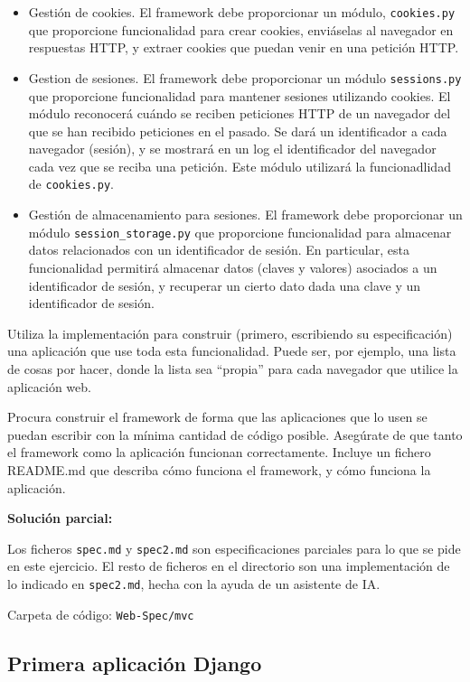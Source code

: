 \begin{itemize}
\item Gestión de cookies. El framework debe proporcionar un módulo, \texttt{cookies.py} que proporcione funcionalidad para crear cookies, enviáselas al navegador en respuestas HTTP, y extraer cookies que puedan venir en una petición HTTP.
\item Gestion de sesiones. El framework debe proporcionar un módulo \texttt{sessions.py} que proporcione funcionalidad para mantener sesiones utilizando cookies. El módulo reconocerá cuándo se reciben peticiones HTTP de un navegador del que se han recibido peticiones en el pasado. Se dará un identificador a cada navegador (sesión), y se mostrará en un log el identificador del navegador cada vez que se reciba una petición. Este módulo utilizará la funcionadlidad de \texttt{cookies.py}.
\item Gestión de almacenamiento para sesiones. El framework debe proporcionar un módulo \texttt{session\_storage.py} que proporcione funcionalidad para almacenar datos relacionados con un identificador de sesión. En particular, esta funcionalidad permitirá almacenar datos (claves y valores) asociados a un identificador de sesión, y recuperar un cierto dato dada una clave y un identificador de sesión.
\end{itemize}


Utiliza la implementación para construir (primero, escribiendo su especificación) una aplicación que use toda esta funcionalidad. Puede ser, por ejemplo, una lista de cosas por hacer, donde la lista sea ``propia'' para cada navegador que utilice la aplicación web.

Procura construir el framework de forma que las aplicaciones que lo usen se puedan escribir con la mínima cantidad de código posible. Asegúrate de que tanto el framework como la aplicación funcionan correctamente. Incluye un fichero README.md que describa cómo funciona el framework, y cómo funciona la aplicación.

\textbf{Solución parcial:}

Los ficheros \texttt{spec.md} y \texttt{spec2.md} son especificaciones parciales para lo que se pide en este ejercicio. El resto de ficheros en el directorio son una implementación de lo indicado en  \texttt{spec2.md}, hecha con la ayuda de un asistente de IA.

Carpeta de código: \texttt{Web-Spec/mvc}

\subsection{Primera aplicación Django}
\label{subsec:django-primera}

